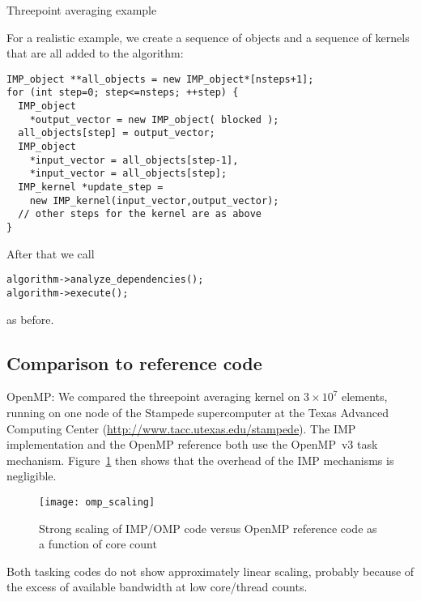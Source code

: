  {Threepoint averaging example}

For a realistic example, we create a sequence of objects and a sequence of kernels
that are all added to the algorithm:
\begin{verbatim}
IMP_object **all_objects = new IMP_object*[nsteps+1];
for (int step=0; step<=nsteps; ++step) {
  IMP_object
    *output_vector = new IMP_object( blocked );
  all_objects[step] = output_vector;
  IMP_object
    *input_vector = all_objects[step-1],
    *input_vector = all_objects[step];
  IMP_kernel *update_step = 
    new IMP_kernel(input_vector,output_vector);
  // other steps for the kernel are as above
}
\end{verbatim}
After that we call
\begin{verbatim}
algorithm->analyze_dependencies();
algorithm->execute();
\end{verbatim}
as before.

\subsection {Comparison to reference code}

OpenMP: We compared the threepoint averaging kernel on $3\times 10^7$
elements, running on one node of the Stampede supercomputer at the
Texas Advanced Computing Center
(\url{http://www.tacc.utexas.edu/stampede}). The IMP implementation
and the OpenMP reference both use the
OpenMP~v3 task mechanism. Figure~\ref{fig:omp-scale} 
then shows that the overhead of the IMP mechanisms is negligible.
\begin{figure}[ht]
  \texttt{[image: omp\_scaling]}
  \caption{Strong scaling of IMP/OMP code versus OpenMP reference code
    as a function of core count}
  \label{fig:omp-scale}
\end{figure}
Both tasking codes do not show approximately linear scaling, probably
because of the excess of available bandwidth at low core/thread
counts.

